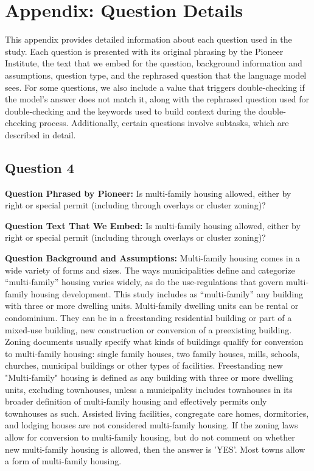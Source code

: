 \section*{Appendix: Question Details}
This appendix provides detailed information about each question used in the study. Each question is presented with its original phrasing by the Pioneer Institute, the text that we embed for the question, background information and assumptions, question type, and the rephrased question that the language model sees. For some questions, we also include a value that triggers double-checking if the model's answer does not match it, along with the rephrased question used for double-checking and the keywords used to build context during the double-checking process. Additionally, certain questions involve subtasks, which are described in detail.

\subsection*{Question 4}
\noindent\textbf{Question Phrased by Pioneer:} Is multi-family housing allowed, either by right or special permit (including through overlays or cluster zoning)?

\noindent\textbf{Question Text That We Embed:} Is multi-family housing allowed, either by right or special permit (including through overlays or cluster zoning)?

\noindent\textbf{Question Background and Assumptions:} Multi-family housing comes in a wide variety of forms and sizes. The ways municipalities define and categorize “multi-family” housing varies widely, as do the use-regulations that govern multi-family housing development. This study includes as “multi-family” any building with three or more dwelling units. Multi-family dwelling units can be rental or condominium. They can be in a freestanding residential building or part of a mixed-use building, new construction or conversion of a preexisting building. Zoning documents usually specify what kinds of buildings qualify for conversion to multi-family housing: single family houses, two family houses, mills, schools, churches, municipal buildings or other types of facilities. Freestanding new "Multi-family" housing is defined as any building with three or more dwelling units, excluding townhouses, unless a municipality includes townhouses in its broader definition of multi-family housing and effectively permits only townhouses as such. Assisted living facilities, congregate care homes, dormitories, and lodging houses are not considered multi-family housing. If the zoning laws allow for conversion to multi-family housing, but do not comment on whether new multi-family housing is allowed, then the answer is 'YES'. Most towns allow a form of multi-family housing.


